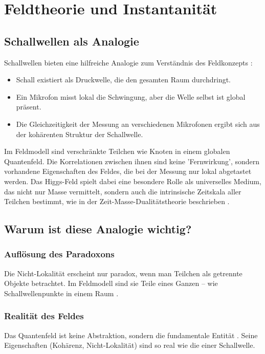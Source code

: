 \documentclass[12pt,a4paper]{article}
\begin{document}
	\section{Feldtheorie und Instantanität}
	\subsection{Schallwellen als Analogie}
	Schallwellen bieten eine hilfreiche Analogie zum Verständnis des Feldkonzepts \cite{Bohm1980}:
	\begin{itemize}
		\item Schall existiert als Druckwelle, die den gesamten Raum durchdringt.
		\item Ein Mikrofon misst lokal die Schwingung, aber die Welle selbst ist global präsent.
		\item Die Gleichzeitigkeit der Messung an verschiedenen Mikrofonen ergibt sich aus der kohärenten Struktur der Schallwelle.
	\end{itemize}
	Im Feldmodell sind verschränkte Teilchen wie Knoten in einem globalen Quantenfeld. Die Korrelationen zwischen ihnen sind keine 'Fernwirkung', sondern vorhandene Eigenschaften des Feldes, die bei der Messung nur lokal abgetastet werden. Das Higgs-Feld spielt dabei eine besondere Rolle als universelles Medium, das nicht nur Masse vermittelt, sondern auch die intrinsische Zeitskala aller Teilchen bestimmt, wie in der Zeit-Masse-Dualitätstheorie beschrieben \cite{Pascher2024}.
	
	\subsection{Warum ist diese Analogie wichtig?}
	\subsubsection{Auflösung des Paradoxons}
	Die Nicht-Lokalität erscheint nur paradox, wenn man Teilchen als getrennte Objekte betrachtet. Im Feldmodell sind sie Teile eines Ganzen – wie Schallwellenpunkte in einem Raum \cite{Bohm1980}.
	
	\subsubsection{Realität des Feldes}
	Das Quantenfeld ist keine Abstraktion, sondern die fundamentale Entität \cite{Weinberg1995}. Seine Eigenschaften (Kohärenz, Nicht-Lokalität) sind so real wie die einer Schallwelle.
	
\end{document}
